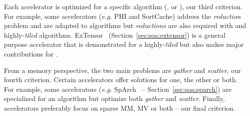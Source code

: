 Each accelerator is optimized for a specific algorithm (,  or ), our third criterion. For example, some accelerators (\emph{e.g.} PHI and SortCache) address the \emph{reduction} problem and are adapted to  algorithms but \emph{reductions} are also required with  and highly-\emph{tiled} algorithms. ExTensor~\cite{Hegde2019_ExTensor} (Section~\ref{sec:soa:extensor}) is a general purpose accelerator that is demonstrated for a highly-\emph{tiled}  but also makes major contributions for . 

From a memory perspective, the two main problems are \emph{gather} and \emph{scatter}, our fourth criterion. Certain accelerators offer solutions for one, the other or both. For example, some accelerators (\emph{e.g.} SpArch~\cite{Zhekai2020_SpArch} -- Section~\ref{sec:soa:sparch}) are specialized for an  algorithm but optimize both \emph{gather} and \emph{scatter}. Finally, accelerators preferably focus on sparse MM, MV or both -- our final criterion.



